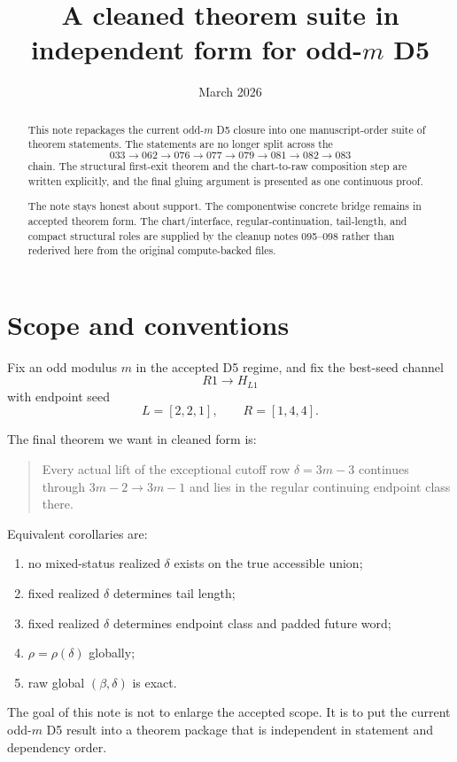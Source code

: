 \documentclass[11pt]{article}
\title{A cleaned theorem suite in independent form for odd-$m$ D5}
\author{}
\date{March 2026}
\begin{document}
\maketitle

\begin{abstract}
This note repackages the current odd-$m$ D5 closure into one
manuscript-order suite of theorem statements. The statements are no longer
split across the
\[
033 \to 062 \to 076 \to 077 \to 079 \to 081 \to 082 \to 083
\]
chain. The structural first-exit theorem and the chart-to-raw composition step
are written explicitly, and the final gluing argument is presented as one
continuous proof.

The note stays honest about support. The componentwise concrete bridge remains
in accepted theorem form. The chart/interface, regular-continuation,
tail-length, and compact structural roles are supplied by the cleanup notes
095--098 rather than rederived here from the original compute-backed files.
\end{abstract}

\section{Scope and conventions}

Fix an odd modulus $m$ in the accepted D5 regime, and fix the best-seed channel
\[
R1 \to H_{L1}
\]
with endpoint seed
\[
L=[2,2,1], \qquad R=[1,4,4].
\]

The final theorem we want in cleaned form is:
\begin{quote}
Every actual lift of the exceptional cutoff row $\delta=3m-3$ continues through
$3m-2 \to 3m-1$ and lies in the regular continuing endpoint class there.
\end{quote}
Equivalent corollaries are:
\begin{enumerate}[label=\textup{(\arabic*)},leftmargin=2.5em]
\item no mixed-status realized $\delta$ exists on the true accessible union;
\item fixed realized $\delta$ determines tail length;
\item fixed realized $\delta$ determines endpoint class and padded future word;
\item $\rho = \rho(\delta)$ globally;
\item raw global $(\beta,\delta)$ is exact.
\end{enumerate}

The goal of this note is not to enlarge the accepted scope. It is to put the
current odd-$m$ D5 result into a theorem package that is independent in
statement and dependency order.
\end{document}
